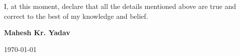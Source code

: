 
\begin{cvparagraph}

I, at this moment, declare that all the details mentioned above are true and correct to the best of my knowledge
and belief.
   
\hfill \textbf{Mahesh Kr. Yadav}
\begin{flushright}
\today \currenttime
\end{flushright}
\end{cvparagraph}
